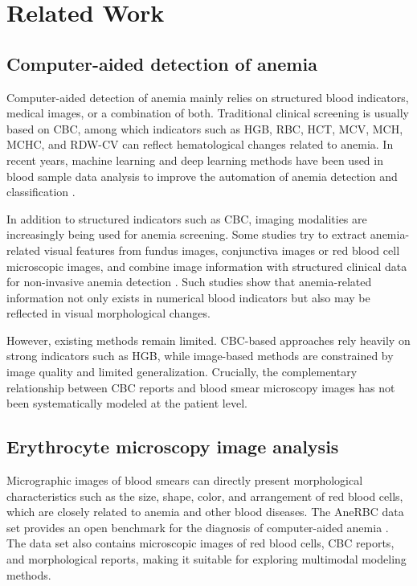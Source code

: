 \documentclass[conference]{IEEEtran}
\begin{document}
\section{Related Work}

\subsection{Computer-aided detection of anemia}

Computer-aided detection of anemia mainly relies on structured blood indicators, medical images, or a combination of both. Traditional clinical screening is usually based on CBC, among which indicators such as HGB, RBC, HCT, MCV, MCH, MCHC, and RDW-CV can reflect hematological changes related to anemia. In recent years, machine learning and deep learning methods have been used in blood sample data analysis to improve the automation of anemia detection and classification \cite{ref4}.

In addition to structured indicators such as CBC, imaging modalities are increasingly being used for anemia screening. Some studies try to extract anemia-related visual features from fundus images, conjunctiva images or red blood cell microscopic images, and combine image information with structured clinical data for non-invasive anemia detection \cite{ref5}. Such studies show that anemia-related information not only exists in numerical blood indicators but also may be reflected in visual morphological changes.

However, existing methods remain limited. CBC-based approaches rely heavily on strong indicators such as HGB, while image-based methods are constrained by image quality and limited generalization. Crucially, the complementary relationship between CBC reports and blood smear microscopy images has not been systematically modeled at the patient level.

\subsection{Erythrocyte microscopy image analysis}

Micrographic images of blood smears can directly present morphological characteristics such as the size, shape, color, and arrangement of red blood cells, which are closely related to anemia and other blood diseases. The AneRBC data set provides an open benchmark for the diagnosis of computer-aided anemia \cite{ref3}. The data set also contains microscopic images of red blood cells, CBC reports, and morphological reports, making it suitable for exploring multimodal modeling methods.
\end{document}
